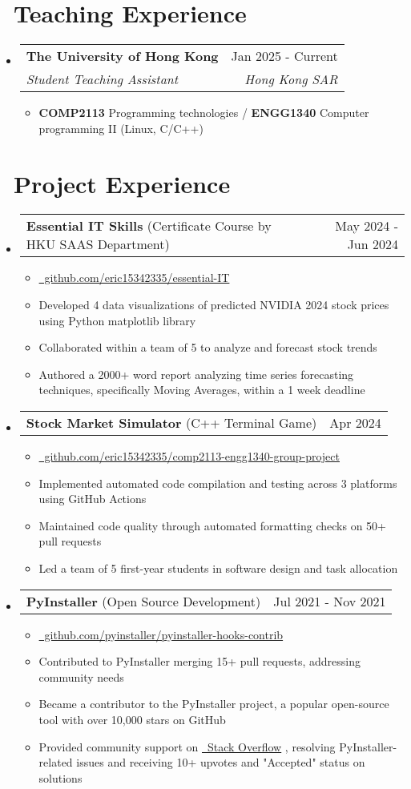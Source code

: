 \documentclass[letterpaper,11pt]{article}
\makeatletter
\newcommand{\iconlink}[3]{
  \href{#2}{#1~#3}
}
\newcommand{\iconsection}[2]{
  \section[#2]{#1~#2}
}
\newcommand{\resumeItem}[1]{
  \item\small{
    {#1 \vspace{-2pt}}
  }
}
\newcommand{\resumeSubheading}[4]{
  \vspace{-2pt}\item
    \begin{tabular*}{0.98\textwidth}[t]{l@{\extracolsep{\fill}}r}
      \textbf{#1} & #2 \\
      \textit{\small#3} & \textit{\small #4} \\
    \end{tabular*}\vspace{-7pt}
}
\newcommand{\resumeProjectHeading}[2]{
    \item
    \begin{tabular*}{0.98\textwidth}{l@{\extracolsep{\fill}}r}
      \small#1 & #2 \\
    \end{tabular*}\vspace{-7pt}
}
\newcommand{\resumeSubHeadingListStart}{\begin{itemize}[leftmargin=0.15in, label={}]}
\newcommand{\resumeSubHeadingListEnd}{\end{itemize}}
\newcommand{\resumeItemListStart}{\begin{itemize}}
\newcommand{\resumeItemListEnd}{\end{itemize}\vspace{-5pt}}
\makeatother
\begin{document}
\iconsection{\faChalkboardTeacher}{Teaching Experience}
  \resumeSubHeadingListStart
    \resumeSubheading
      {The University of Hong Kong}{Jan 2025 - Current}
      {Student Teaching Assistant}{Hong Kong SAR}
      \resumeItemListStart
        \resumeItem{\textbf{COMP2113} Programming technologies / \textbf{ENGG1340} Computer programming II (Linux, C/C++)}
      \resumeItemListEnd
  \resumeSubHeadingListEnd

\iconsection{\faLaptopCode}{Project Experience}
  \resumeSubHeadingListStart
    \resumeProjectHeading
      {\textbf{Essential IT Skills} (Certificate Course by HKU SAAS Department)}{May 2024 - Jun 2024}
      \resumeItemListStart
        \resumeItem{\iconlink{\faGithub}{https://github.com/eric15342335/essential-IT}{github.com/eric15342335/essential-IT}}
        \resumeItem{Developed 4 data visualizations of predicted NVIDIA 2024 stock prices using Python matplotlib library}
        \resumeItem{Collaborated within a team of 5 to analyze and forecast stock trends}
        \resumeItem{Authored a 2000+ word report analyzing time series forecasting techniques, specifically Moving Averages, within a 1 week deadline}
      \resumeItemListEnd
    \resumeProjectHeading
      {\textbf{Stock Market Simulator} (C++ Terminal Game)}{Apr 2024}
      \resumeItemListStart
        \resumeItem{\iconlink{\faGithub}{https://github.com/eric15342335/comp2113-engg1340-group-project}{github.com/eric15342335/comp2113-engg1340-group-project}}
        \resumeItem{Implemented automated code compilation and testing across 3 platforms using GitHub Actions}
        \resumeItem{Maintained code quality through automated formatting checks on 50+ pull requests}
        \resumeItem{Led a team of 5 first-year students in software design and task allocation}
      \resumeItemListEnd
    \resumeProjectHeading
      {\textbf{PyInstaller} (Open Source Development)}{Jul 2021 - Nov 2021}
      \resumeItemListStart
        \resumeItem{\iconlink{\faGithub}{https://github.com/pyinstaller/pyinstaller-hooks-contrib}{github.com/pyinstaller/pyinstaller-hooks-contrib}}
        \resumeItem{Contributed to PyInstaller merging 15+ pull requests, addressing community needs}
        \resumeItem{Became a contributor to the PyInstaller project, a popular open-source tool with over 10,000 stars on GitHub}
        \resumeItem{Provided community support on \iconlink{\faStackOverflow}{https://stackoverflow.com/}{Stack Overflow}, resolving PyInstaller-related issues and receiving 10+ upvotes and "Accepted" status on solutions}
      \resumeItemListEnd
  \resumeSubHeadingListEnd
\end{document}
